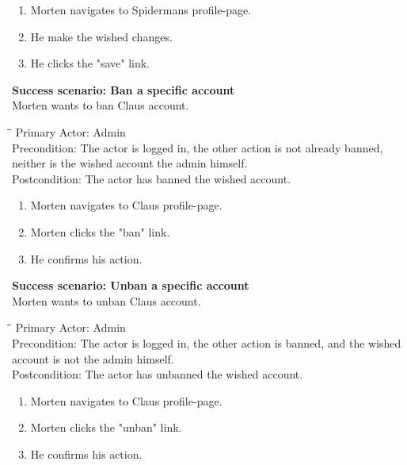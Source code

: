 \begin{enumerate} \setlength{\itemsep}{-1mm}
	\item Morten navigates to Spidermans profile-page.
	\item He make the wished changes.
	\item He clicks the "save" link.
\end{enumerate}
\vspace{3mm}
\textbf{Success scenario: Ban a specific account} \\
Morten wants to ban Claus account.
\begin{tabbing}
\hspace{5mm}\=\hspace{26mm}\=\kill
\>Primary Actor:\> Admin\\
\>Precondition:\> The actor is logged in, the other action is not already banned, neither is the wished account the admin himself.\\
\>Postcondition:\> The actor has banned the wished account.
\end{tabbing}
\begin{enumerate} \setlength{\itemsep}{-1mm}
	\item Morten navigates to Claus profile-page.
	\item Morten clicks the "ban" link.
	\item He confirms his action.
\end{enumerate}
\vspace{3mm}
\textbf{Success scenario: Unban a specific account} \\
Morten wants to unban Claus account.
\begin{tabbing}
\hspace{5mm}\=\hspace{26mm}\=\kill
\>Primary Actor:\> Admin\\
\>Precondition:\> The actor is logged in, the other action is banned, and the wished account is not the admin himself.\\
\>Postcondition:\> The actor has unbanned the wished account.
\end{tabbing}
\begin{enumerate} \setlength{\itemsep}{-1mm}
	\item Morten navigates to Claus profile-page.
	\item Morten clicks the "unban" link.
	\item He confirms his action.
\end{enumerate}
\vspace{3mm}
